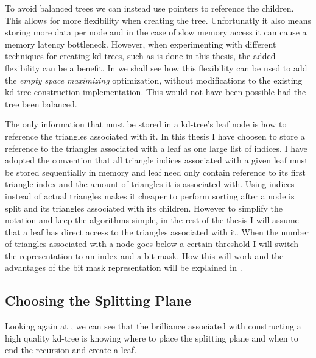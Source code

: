 To avoid balanced trees we can instead use pointers to reference the
children. This allows for more flexibility when creating the tree.  Unfortunatly
it also means storing more data per node and in the case of slow memory access
it can cause a memory latency bottleneck. However, when experimenting with
different techniques for creating kd-trees, such as is done in this thesis, the
added flexibility can be a benefit. In  we shall
see how this flexibility can be used to add the \textit{empty space maximizing}
optimization, without modifications to the existing kd-tree construction
implementation. This would not have been possible had the tree been balanced.


The only information that must be stored in a kd-tree's leaf node is how to
reference the triangles associated with it. In this thesis I have choosen to
store a reference to the triangles associated with a leaf as one large list of
indices. I have adopted the convention that all triangle indices associated with
a given leaf must be stored sequentially in memory and leaf need only contain
reference to its first triangle index and the amount of triangles it is
associated with. Using indices instead of actual triangles makes it cheaper to
perform sorting after a node is split and its triangles associated with its
children. However to simplify the notation and keep the algorithms simple, in
the rest of the thesis I will assume that a leaf has direct access to the
triangles associated with it. When the number of triangles associated with a
node goes below a certain threshold I will switch the representation to an index
and a bit mask. How this will work and the advantages of the bit mask
representation will be explained in .


\subsection{Choosing the Splitting Plane}\label{sec:splittingPlane}


Looking again at , we can see that the brilliance
associated with constructing a high quality kd-tree is knowing where to place
the splitting plane and when to end the recursion and create a leaf.


